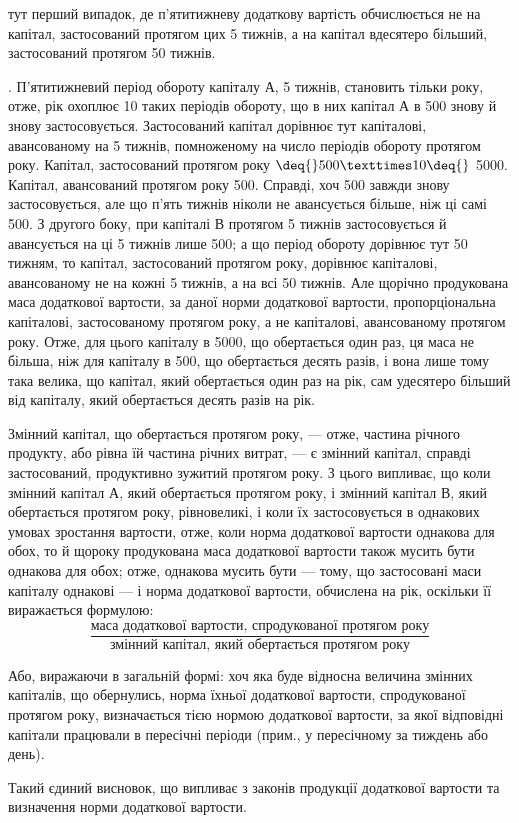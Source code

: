 \parcont{}  %
тут перший випадок, де п’ятитижневу додаткову вартість обчислюється
не на капітал, застосований протягом цих 5 тижнів, а на капітал вдесятеро
більший, застосований протягом 50 тижнів.

. П’ятитижневий період обороту капіталу $А$, 5 тижнів,
становить тільки  року, отже, рік охоплює 10 таких періодів обороту,
що в них капітал $А$ в 500 знову й знову застосовується.
Застосований капітал дорівнює тут капіталові, авансованому на 5 тижнів,
помноженому на число періодів обороту протягом року. Капітал, застосований
протягом року $\deq{} 500 × 10 \deq{}$ 5000. Капітал, авансований
протягом року \deq{}  \deq{} 500. Справді, хоч 500 завжди
знову застосовується, але що п’ять тижнів ніколи не авансується більше,
ніж ці самі 500. З другого боку, при капіталі $В$ протягом 5 тижнів
застосовується й авансується на ці 5 тижнів лише 500; а що
період обороту дорівнює тут 50 тижням, то капітал, застосований протягом
року, дорівнює капіталові, авансованому не на кожні 5 тижнів, а на
всі 50 тижнів. Але щорічно продукована маса додаткової вартости, за
даної норми додаткової вартости, пропорціональна капіталові, застосованому
протягом року, а не капіталові, авансованому протягом року. Отже, для
цього капіталу в 5000, що обертається один раз, ця маса не
більша, ніж для капіталу в 500, що обертається десять разів, і
вона лише тому така велика, що капітал, який обертається один раз на
рік, сам удесятеро більший від капіталу, який обертається десять разів
на рік.

Змінний капітал, що обертається протягом року, — отже, частина річного
продукту, або рівна їй частина річних витрат, — є змінний капітал,
справді застосований, продуктивно зужитий протягом року. З цього випливає,
що коли змінний капітал $А$, який обертається протягом року, і
змінний капітал $В$, який обертається протягом року, рівновеликі, і коли
їх застосовується в однакових умовах зростання вартости, отже, коли норма
додаткової вартости однакова для обох, то й щороку продукована
маса додаткової вартости також мусить бути однакова для обох; отже,
однакова мусить бути — тому, що застосовані маси капіталу однакові — і
норма додаткової вартости, обчислена на рік, оскільки її виражається
формулою:\[
\frac{\text{маса додаткової вартости, спродукованої протягом року}}{\text{змінний капітал, який обертається протягом
року}}
\]

\noindent{}Або, виражаючи в загальній формі: хоч яка буде відносна величина
змінних капіталів, що обернулись, норма їхньої додаткової вартости,
спродукованої протягом року, визначається тією нормою додаткової вартости,
за якої відповідні капітали працювали в пересічні періоди (прим.,
у пересічному за тиждень або день).

Такий єдиний висновок, що випливає з законів продукції додаткової
вартости та визначення норми додаткової вартости.

